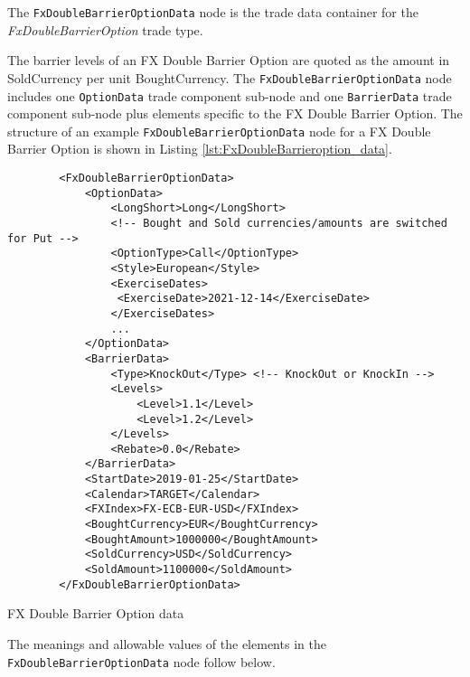 \fi

The \lstinline!FxDoubleBarrierOptionData!  node is the trade data container for the \emph{FxDoubleBarrierOption} trade type.  

The barrier levels of an FX Double Barrier Option are quoted as the amount in SoldCurrency
per unit BoughtCurrency. The \lstinline!FxDoubleBarrierOptionData!  node includes one  \lstinline!OptionData! trade component sub-node and one \lstinline!BarrierData! trade component sub-node plus elements
specific to the FX Double Barrier Option. The structure of an example \lstinline!FxDoubleBarrierOptionData! node for a FX Double Barrier Option is shown in Listing
\ref{lst:FxDoubleBarrieroption_data}.

\begin{listing}[H]
\begin{verbatim}
        <FxDoubleBarrierOptionData>
            <OptionData>
                <LongShort>Long</LongShort>
                <!-- Bought and Sold currencies/amounts are switched for Put -->
                <OptionType>Call</OptionType>
                <Style>European</Style>
                <ExerciseDates>
                 <ExerciseDate>2021-12-14</ExerciseDate>
                </ExerciseDates>                
                ...
            </OptionData>
            <BarrierData>
                <Type>KnockOut</Type> <!-- KnockOut or KnockIn -->
                <Levels>
                    <Level>1.1</Level>
                    <Level>1.2</Level>
                </Levels>
                <Rebate>0.0</Rebate>   
            </BarrierData>
            <StartDate>2019-01-25</StartDate>
            <Calendar>TARGET</Calendar>            
            <FXIndex>FX-ECB-EUR-USD</FXIndex>
            <BoughtCurrency>EUR</BoughtCurrency>
            <BoughtAmount>1000000</BoughtAmount>
            <SoldCurrency>USD</SoldCurrency>
            <SoldAmount>1100000</SoldAmount>
        </FxDoubleBarrierOptionData>
\end{verbatim}
\caption{FX Double Barrier Option data}
\label{lst:FxDoubleBarrieroption_data}
\end{listing}

The meanings and allowable values of the elements in the \lstinline!FxDoubleBarrierOptionData!  node follow below.

